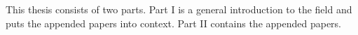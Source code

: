 \documentclass[../main.tex]{subfiles}
\begin{document}


This thesis consists of two parts. Part I is a general introduction to the field and puts the appended papers into context. Part II contains the appended papers.

\end{document}
